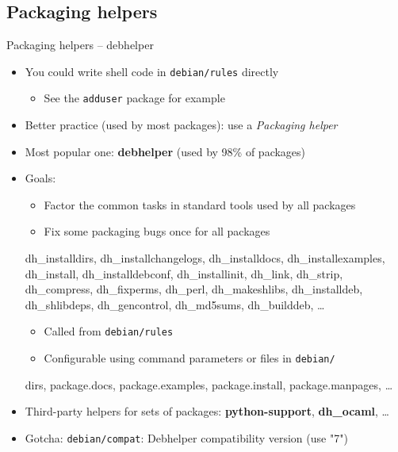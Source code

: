 \documentclass[10pt,final]{beamer}
\begin{document}
\subsection{Packaging helpers}
\begin{frame}{Packaging helpers -- debhelper}
  \begin{itemize}
  \item You could write shell code in \texttt{debian/rules} directly
    \begin{itemize}
    \item See the \texttt{adduser} package for example
    \end{itemize}
    \hbr
  \item Better practice (used by most packages): use a \textsl{Packaging helper}
    \hbr
  \item Most popular one: \textbf{debhelper} (used by 98\% of packages)
    \hbr
  \item Goals:
    \begin{itemize}
    \item Factor the common tasks in standard tools used by all packages
    \item Fix some packaging bugs once for all packages
    \end{itemize}
    {\footnotesize dh\_installdirs, dh\_installchangelogs, dh\_installdocs,
      dh\_installexamples, dh\_install, dh\_installdebconf, dh\_installinit,
      dh\_link, dh\_strip, dh\_compress, dh\_fixperms, dh\_perl,
      dh\_makeshlibs, dh\_installdeb, dh\_shlibdeps, dh\_gencontrol,
      dh\_md5sums, dh\_builddeb, \ldots}
    \begin{itemize}
    \item Called from \texttt{debian/rules}
    \item Configurable using command parameters or files in \texttt{debian/}
    \end{itemize}
    {\footnotesize \ttfamily dirs, package.docs, package.examples,
      package.install, package.manpages, \ldots} \hbr
  \item Third-party helpers for sets of packages: \textbf{python-support},
    \textbf{dh\_ocaml}, \ldots \hbr
  \item Gotcha: \texttt{debian/compat}: Debhelper compatibility version (use "7")
  \end{itemize}
\end{frame}
\end{document}
